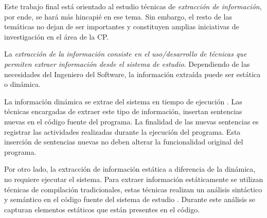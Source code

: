 \documentclass[a4paper,12pt]{report}
\begin{document}
\hspace{0.5cm} Este trabajo final está orientado al estudio técnicas de \textit{extracción de información}, por ende, se hará más hincapié en ese tema. Sin embargo, el resto de las temáticas no dejan de ser importantes y constituyen amplias iniciativas de investigación en el área de la CP.

\hspace{0.5cm} La \textit{extracción de la información consiste en el uso/desarrollo de técnicas que permiten extraer información desde el sistema de estudio}. Dependiendo de las necesidades del Ingeniero del Software, la información extraída puede ser estática o dinámica.
 
\hspace{0.5cm}La información dinámica se extrae del sistema en tiempo de ejecución \cite{THBE99, TERD01}. Las técnicas encargadas de extraer este tipo de información, insertan sentencias nuevas en el código fuente del programa. La finalidad de las nuevas sentencias es registrar las actividades realizadas durante la ejecución del programa. Esta inserción de sentencias nuevas no deben alterar la funcionalidad original del programa.



\hspace{0.5cm}Por otro lado, la extracción de información estática a diferencia de la dinámica, no requiere ejecutar el sistema. Para extraer información estáticamente se utilizan técnicas de compilación tradicionales, estas técnicas realizan un análisis sintáctico y semántico en el código fuente del sistema de estudio \cite{TERD01, AHUL06}. Durante este análisis se capturan elementos estáticos que están presentes en el código.
\end{document}
